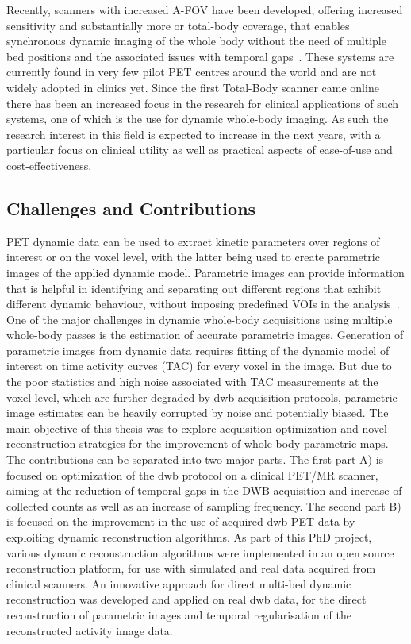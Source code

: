 Recently, scanners with increased A-FOV have been developed, offering increased sensitivity and substantially more or total-body coverage, that enables synchronous dynamic imaging of the whole body without the need of multiple bed positions and the associated issues with temporal gaps~\cite{Karp2020,Siegel2020, Cherry2018}.
These systems are currently found in very few pilot PET centres around the world and are not widely adopted in clinics yet. Since the first Total-Body scanner came online there has been an increased focus in the research for clinical applications of such systems, one of which is the use for dynamic whole-body imaging. As such the research interest in this field is expected to increase in the next years, with a particular focus on clinical utility as well as practical aspects of ease-of-use and cost-effectiveness.

\subsection*{Challenges and Contributions}
PET dynamic data can be used to extract kinetic parameters over regions of interest or on the voxel level, with the latter being used to create parametric images of the applied dynamic model.
Parametric images can provide information that is helpful in identifying and separating out different regions that exhibit different dynamic behaviour, without imposing predefined VOIs in the analysis~\cite{Gallezot2019}.  
One of the major challenges in dynamic whole-body acquisitions using multiple whole-body passes is the estimation of accurate parametric images. Generation of parametric images from dynamic data requires fitting of the dynamic model of interest on time activity curves (TAC) for every voxel in the image. But due to the poor statistics and high noise associated with TAC measurements at the voxel level, which are further degraded by \gls{dwb} acquisition protocols, parametric image estimates can be heavily corrupted by noise and potentially biased. 
The main objective of this thesis was to explore acquisition optimization and novel reconstruction strategies for the improvement of whole-body parametric maps. 
The contributions can be separated into two major parts. The first part A) is focused on optimization of the \gls{dwb} protocol on a clinical PET/MR scanner, aiming at the reduction of temporal gaps in the DWB acquisition and increase of collected counts as well as an increase of sampling frequency. The second part B) is focused on the improvement in the use of acquired \gls{dwb} PET data by exploiting dynamic reconstruction algorithms. As part of this PhD project, various dynamic reconstruction algorithms were implemented in an open source reconstruction platform, for use with simulated and real data acquired from clinical scanners. An innovative approach for direct multi-bed dynamic reconstruction was developed and applied on real \gls{dwb} data, for the direct reconstruction of parametric images and temporal regularisation of the reconstructed activity image data.

